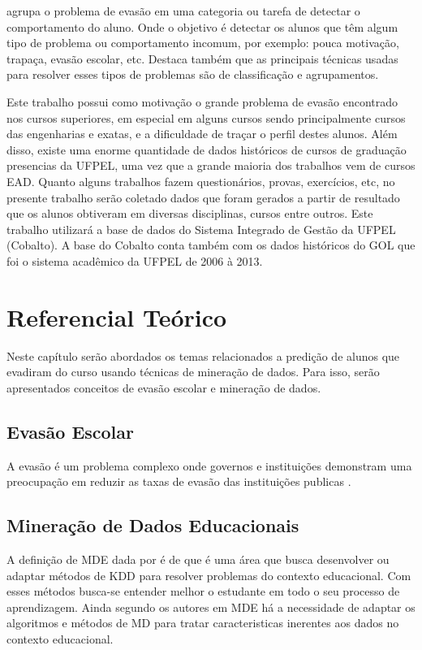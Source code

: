 \documentclass[diss,capa]{texufpel}
\begin{document}
    \citet{baker2010data} agrupa o problema de evasão em uma categoria ou tarefa de detectar o comportamento do aluno.
    Onde o objetivo é detectar os alunos que têm algum tipo de problema ou comportamento incomum, por exemplo: pouca motivação, trapaça, evasão escolar, etc.
    Destaca também que as principais técnicas usadas para resolver esses tipos de problemas são de classificação e agrupamentos.

    Este trabalho possui como motivação o grande problema de evasão encontrado nos cursos superiores, em especial em alguns cursos sendo principalmente cursos das engenharias e exatas, e a dificuldade de traçar o perfil destes alunos.
    Além disso, existe uma enorme quantidade de dados históricos de cursos de graduação presencias da UFPEL, uma vez que a grande maioria dos trabalhos vem de cursos EAD.
    Quanto alguns trabalhos fazem questionários, provas, exercícios, etc, no presente trabalho serão coletado dados que foram gerados a partir de resultado que os alunos obtiveram em diversas disciplinas, cursos entre outros.
    Este trabalho utilizará a base de dados do Sistema Integrado de Gestão da UFPEL (Cobalto).
    A base do Cobalto conta também com os dados históricos do GOL que foi o sistema acadêmico da UFPEL de 2006 à 2013.



\chapter{Referencial Teórico}

    Neste capítulo serão abordados os temas relacionados a predição de alunos que evadiram do curso usando técnicas de mineração de dados.
    Para isso, serão apresentados conceitos de evasão escolar e mineração de dados.

\section{Evasão Escolar}

    A evasão é um problema complexo onde governos e instituições demonstram uma preocupação em reduzir as taxas de evasão das instituições publicas \cite{Manhaes2011}.
  
\section{Mineração de Dados Educacionais}

    A definição de MDE dada por \citet{Costa2012} é de que é uma área que busca desenvolver ou adaptar métodos de KDD para resolver problemas do contexto educacional.
    Com esses métodos busca-se entender melhor o estudante em todo o seu processo de aprendizagem.
    Ainda segundo os autores em MDE há a necessidade de adaptar os algoritmos e métodos de MD para tratar caracteristicas inerentes aos dados no contexto educacional.
\end{document}
